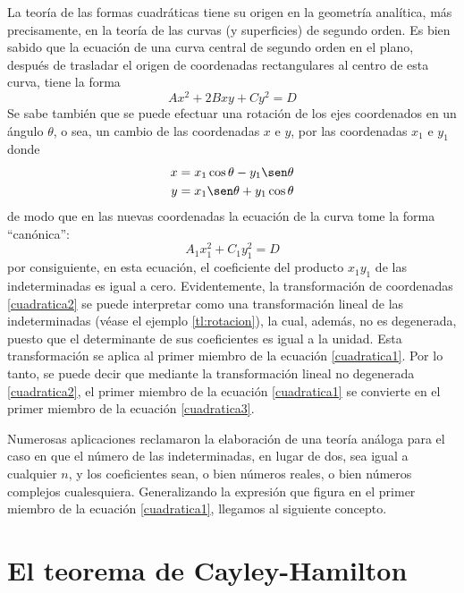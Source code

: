 La teoría de las formas cuadráticas tiene su origen en la geometría analítica, más precisamente, en la teoría de las curvas (y superficies) de segundo orden. Es bien sabido que la ecuación de una curva central de segundo orden en el plano, después de trasladar el origen de coordenadas rectangulares al centro de esta curva, tiene la forma
\begin{equation}
    Ax^2 + 2Bxy + Cy^2 = D \label{cuadratica1}
\end{equation}
Se sabe también que se puede efectuar una rotación de los ejes coordenados en un ángulo $\theta$, o sea, un cambio de las coordenadas $x$ e $y$, por las coordenadas $x_1$ e $y_1$ donde
\begin{equation}
    \begin{aligned}
        x & = x_1 \cos \theta - y_1 \sen \theta \\
        y & = x_1 \sen \theta + y_1 \cos \theta
    \end{aligned} \label{cuadratica2}
\end{equation}
de modo que en las nuevas coordenadas la ecuación de la curva tome la forma “canónica”:
\begin{equation}
    A_1x_1^2 + C_1y_1^2 = D \label{cuadratica3}
\end{equation}
por consiguiente, en esta ecuación, el coeficiente del producto $x_1y_1$ de las indeterminadas es igual a cero. Evidentemente, la transformación de coordenadas \eqref{cuadratica2} se puede interpretar como una transformación lineal de las indeterminadas (véase el ejemplo \ref{tl:rotacion}), la cual, además, no es degenerada, puesto que el determinante de sus coeficientes es igual a la unidad. Esta transformación se aplica al primer miembro de la ecuación \eqref{cuadratica1}. Por lo tanto, se puede decir que mediante la transformación lineal no degenerada \eqref{cuadratica2}, el primer miembro de la ecuación \eqref{cuadratica1} se convierte en el primer miembro de la ecuación \eqref{cuadratica3}.


Numerosas aplicaciones reclamaron la elaboración de una teoría análoga para el caso en que el número de las indeterminadas, en lugar de dos, sea igual a cualquier $n$, y los coeficientes sean, o bien números reales, o bien números complejos cualesquiera. Generalizando la expresión que figura en el primer miembro de la ecuación \eqref{cuadratica1}, llegamos al siguiente concepto.

\section{El teorema de Cayley-Hamilton}

